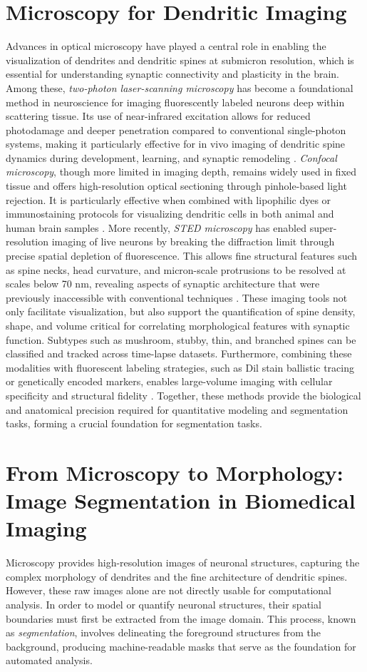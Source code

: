 \section{Microscopy for Dendritic Imaging}
Advances in optical microscopy have played a central role in enabling the visualization of dendrites and dendritic spines at submicron resolution, which is essential for understanding synaptic connectivity and plasticity in the brain. Among these, \textit{two-photon laser-scanning microscopy} has become a foundational method in neuroscience for imaging fluorescently labeled neurons deep within scattering tissue.  Its use of near-infrared excitation allows for reduced photodamage and deeper penetration compared to conventional single-photon systems, making it particularly effective for in vivo imaging of dendritic spine dynamics during development, learning, and synaptic remodeling \cite{Pan_2008, Rose_1999}. \textit{Confocal microscopy}, though more limited in imaging depth, remains widely used in fixed tissue and offers high-resolution optical sectioning through pinhole-based light rejection. It is particularly effective when combined with lipophilic dyes or immunostaining protocols for visualizing dendritic cells in both animal and human brain samples \cite{Sun_2024}. More recently, \textit{\gls{STED} microscopy} has enabled super-resolution imaging of live neurons by breaking the diffraction limit through precise spatial depletion of fluorescence. This allows fine structural features such as spine necks, head curvature, and micron-scale protrusions to be resolved at scales below 70 nm, revealing aspects of synaptic architecture that were previously inaccessible with conventional techniques \cite{Nagerl_2008}. These imaging tools not only facilitate visualization, but also support the quantification of spine density, shape, and volume critical for correlating morphological features with synaptic function. Subtypes such as mushroom, stubby, thin, and branched spines can be classified and tracked across time-lapse datasets. Furthermore, combining these modalities with fluorescent labeling strategies, such as Dil stain ballistic tracing or genetically encoded markers, enables large-volume imaging with cellular specificity and structural fidelity \cite{Sun_2024}. Together, these methods provide the biological and anatomical precision required for quantitative modeling and segmentation tasks, forming a crucial foundation for segmentation tasks.

\section{From Microscopy to Morphology: Image Segmentation in Biomedical Imaging}
Microscopy provides high-resolution images of neuronal structures, capturing the complex morphology of dendrites and the fine architecture of dendritic spines. However, these raw images alone are not directly usable for computational analysis. In order to model or quantify neuronal structures, their spatial boundaries must first be extracted from the image domain. This process, known as \textit{segmentation}, involves delineating the foreground structures from the background, producing machine-readable masks that serve as the foundation for automated analysis.

